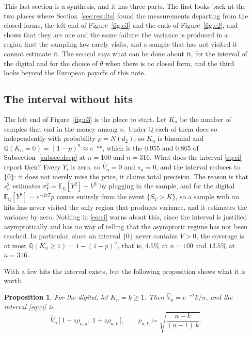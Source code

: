 \documentclass[11pt,a4paper]{article}
\theoremstyle{plain}
\newtheorem{proposition}[theorem]{Proposition}
\theoremstyle{definition}
\theoremstyle{remark}
\newcommand{\E}{\mathbb{E}}
\newcommand{\Q}{\mathbb{Q}}
\newcommand{\1}{\mathbf{1}}
\newcommand{\eqdef}{\coloneqq}
\begin{document}
This last section is a synthesis, and it has three parts. The first looks back at the two places where Section~\ref{sec:results} found the measurements departing from the closed forms, the left end of Figure~\ref{fig:e3} and the ends of Figure~\ref{fig:e2}, and shows that they are one and the same failure: the variance is produced in a region that the sampling law rarely visits, and a sample that has not visited it cannot estimate it. The second says what can be done about it, for the interval of the digital and for the choice of $\theta$ when there is no closed form, and the third looks beyond the European payoffs of this note.

\subsection{The interval without hits}
\label{subsec:nohits}

The left end of Figure~\ref{fig:e3} is the place to start. Let $K_n$ be the number of samples that end in the money among $n$. Under $\Q$ each of them does so independently with probability $p = N(d_2)$, so $K_n$ is binomial and $\Q(K_n = 0) = (1 - p)^n \approx e^{-np}$, which is the $0.955$ and $0.865$ of Subsection~\ref{subsec:deep} at $n = 100$ and $n = 316$. What does the interval \eqref{eq:ci} report then? Every $Y_i$ is zero, so $\hat V_n = 0$ and $s_n = 0$, and the interval reduces to $\{0\}$: it does not merely miss the price, it claims total precision. The reason is that $s_n^2$ estimates $\sigma_Y^2 = \E_\Q[Y^2] - V^2$ by plugging in the sample, and for the digital $\E_\Q[Y^2] = e^{-2rT}p$ comes entirely from the event $\{S_T > K\}$, so a sample with no hits has never visited the only region that produces variance, and it estimates the variance by zero. Nothing in \eqref{eq:ci} warns about this, since the interval is justified asymptotically and has no way of telling that the asymptotic regime has not been reached. In particular, since an interval $\{0\}$ never contains $V > 0$, the coverage is at most $\Q(K_n \ge 1) = 1 - (1 - p)^n$, that is, $4.5\%$ at $n = 100$ and $13.5\%$ at $n = 316$.

With a few hits the interval exists, but the following proposition shows what it is worth.

\begin{proposition}\label{prop:khits}
For the digital, let $K_n = k \ge 1$. Then $\hat V_n = e^{-rT}k/n$, and the interval \eqref{eq:ci} is
\begin{equation}\label{eq:khits}
  \hat V_n\,\bigl[\,1 - z\rho_{n,k},\ 1 + z\rho_{n,k}\,\bigr],
  \qquad
  \rho_{n,k} \eqdef \sqrt{\frac{n - k}{(n-1)\,k}} .
\end{equation}
\end{proposition}
\end{document}
